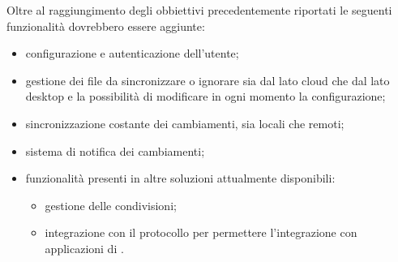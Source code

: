 Oltre al raggiungimento degli obbiettivi precedentemente riportati le seguenti funzionalità dovrebbero essere aggiunte:
\begin{itemize}
\item configurazione e autenticazione dell'utente;
\item gestione dei file da sincronizzare o ignorare sia dal lato cloud che dal lato desktop e la possibilità di modificare in ogni momento la configurazione;
\item sincronizzazione costante dei cambiamenti, sia locali che remoti;
\item sistema di notifica dei cambiamenti;
\item funzionalità presenti in altre soluzioni attualmente disponibili:
    \begin{itemize}
    \item gestione delle condivisioni;
    \item integrazione con il protocollo  per permettere l'integrazione con applicazioni di .
    \end{itemize}
\end{itemize}

